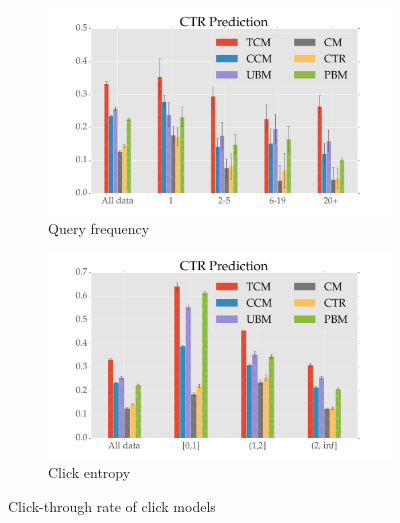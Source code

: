 \begin{figure}
	\centering
	\begin{subfigure}[b]{.49\textwidth}
		\centering
		\includegraphics[width=\textwidth]{figures/CTRPred_qf.pdf}
		\caption{Query frequency}
		\label{fig:ctr_qf}
	\end{subfigure}
	\begin{subfigure}[b]{.49\textwidth}
		\centering
		\includegraphics[width=\textwidth]{figures/CTRPred_ce.pdf}
		\caption{Click entropy}
		\label{fig:ctr_ce}
	\end{subfigure}
	\caption{Click-through rate of click models}
\end{figure}

